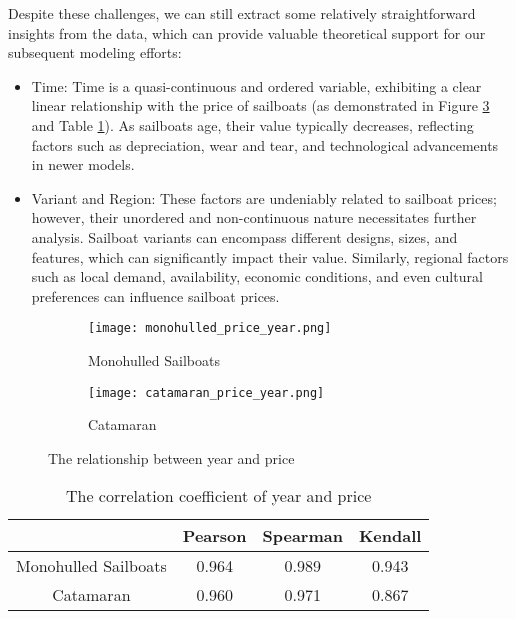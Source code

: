 \documentclass[12pt]{article}  %
\begin{document}
Despite these challenges, we can still extract some relatively straightforward insights from the data, which can provide valuable theoretical support for our subsequent modeling efforts:
\begin{itemize}
    \item Time: Time is a quasi-continuous and ordered variable, exhibiting a clear linear relationship with the price of sailboats (as demonstrated in Figure \ref{fig:year_price} and Table \ref{table: correlation_coefficient}). As sailboats age, their value typically decreases, reflecting factors such as depreciation, wear and tear, and technological advancements in newer models.
    \item Variant and Region: These factors are undeniably related to sailboat prices; however, their unordered and non-continuous nature necessitates further analysis. Sailboat variants can encompass different designs, sizes, and features, which can significantly impact their value. Similarly, regional factors such as local demand, availability, economic conditions, and even cultural preferences can influence sailboat prices.
\end{itemize}
\begin{figure}[htbp]
    \centering
    \begin{subfigure}[b]{.4\textwidth}
    \texttt{[image: monohulled\_price\_year.png]}
    \caption{Monohulled Sailboats}\label{subfig:mono_year}
    \end{subfigure}
    \begin{subfigure}[b]{.4\textwidth}
    \texttt{[image: catamaran\_price\_year.png]}
    \caption{Catamaran}\label{subfig:cata_year}
    \end{subfigure}
    \caption{The relationship between year and price}\label{fig:year_price}
\end{figure} 

\begin{table}[h!]
    \begin{center}
      \begin{tabular}{c|c|c|c}
        & Pearson & Spearman & Kendall\\
        \hline
        \hline
        Monohulled Sailboats&0.964 & 0.989 & 0.943 \\
        Catamaran  &0.960& 0.971 & 0.867\\
      \end{tabular}
      \caption{The correlation coefficient of year and price}\label{table: correlation_coefficient}
    \end{center}
\end{table}
\end{document}
